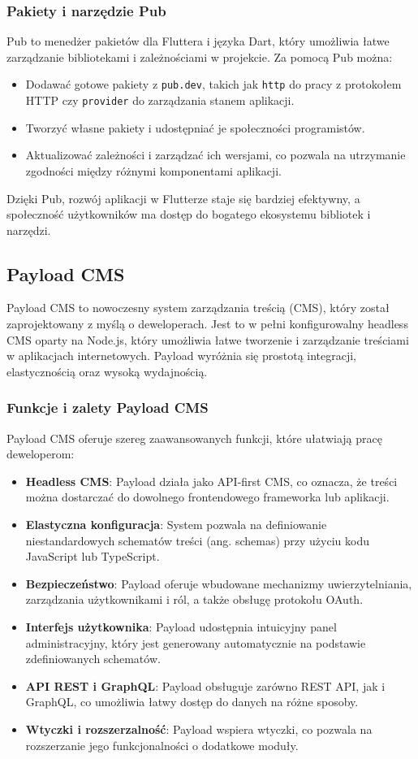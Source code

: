\subsubsection{Pakiety i narzędzie Pub}
Pub to menedżer pakietów dla Fluttera i języka Dart, który umożliwia łatwe zarządzanie bibliotekami i zależnościami w projekcie. Za pomocą Pub można:
\begin{itemize}
	\item Dodawać gotowe pakiety z \texttt{pub.dev}, takich jak \texttt{http} do pracy z protokołem HTTP czy \texttt{provider} do zarządzania stanem aplikacji.
	\item Tworzyć własne pakiety i udostępniać je społeczności programistów.
	\item Aktualizować zależności i zarządzać ich wersjami, co pozwala na utrzymanie zgodności między różnymi komponentami aplikacji.
\end{itemize}

Dzięki Pub, rozwój aplikacji w Flutterze staje się bardziej efektywny, a społeczność użytkowników ma dostęp do bogatego ekosystemu bibliotek i narzędzi.

\subsection{Payload CMS}
Payload CMS to nowoczesny system zarządzania treścią (CMS), który został zaprojektowany z myślą o deweloperach. Jest to w pełni konfigurowalny headless CMS oparty na Node.js, który umożliwia łatwe tworzenie i zarządzanie treściami w aplikacjach internetowych. Payload wyróżnia się prostotą integracji, elastycznością oraz wysoką wydajnością.

\subsubsection{Funkcje i zalety Payload CMS}
Payload CMS oferuje szereg zaawansowanych funkcji, które ułatwiają pracę deweloperom:
\begin{itemize}
	\item \textbf{Headless CMS}: Payload działa jako API-first CMS, co oznacza, że treści można dostarczać do dowolnego frontendowego frameworka lub aplikacji.
	\item \textbf{Elastyczna konfiguracja}: System pozwala na definiowanie niestandardowych schematów treści (ang. schemas) przy użyciu kodu JavaScript lub TypeScript.
	\item \textbf{Bezpieczeństwo}: Payload oferuje wbudowane mechanizmy uwierzytelniania, zarządzania użytkownikami i ról, a także obsługę protokołu OAuth.
	\item \textbf{Interfejs użytkownika}: Payload udostępnia intuicyjny panel administracyjny, który jest generowany automatycznie na podstawie zdefiniowanych schematów.
	\item \textbf{API REST i GraphQL}: Payload obsługuje zarówno REST API, jak i GraphQL, co umożliwia łatwy dostęp do danych na różne sposoby.
	\item \textbf{Wtyczki i rozszerzalność}: Payload wspiera wtyczki, co pozwala na rozszerzanie jego funkcjonalności o dodatkowe moduły.
\end{itemize}

